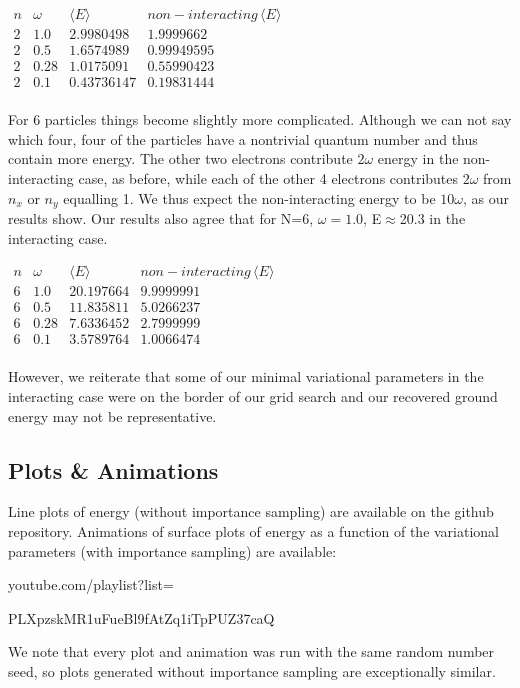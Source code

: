 \documentclass[11pt, conference, compsocconf]{IEEEtran}
\begin{document}
$\begin{array}{cccc}
n & \omega & \langle E\rangle & non-interacting\, \langle E\rangle\\
2 & 1.0 & 2.9980498 & 1.9999662\\
2 & 0.5 & 1.6574989 & 0.99949595\\
2 & 0.28 & 1.0175091 & 0.55990423\\
2 & 0.1 & 0.43736147 & 0.19831444\\
\end{array}$

For 6 particles things become slightly more complicated. Although we can not say which four, four of the particles have a nontrivial quantum number and thus contain more energy. The other two electrons contribute $2\omega$ energy in the non-interacting case, as before, while each of the other 4 electrons contributes $2\omega$ from $n_x$ or $n_y$ equalling 1. We thus expect the non-interacting energy to be $10\omega$, as our results show. Our results also agree that for N=6, $\omega=1.0$, E$\approx$20.3 in the interacting case. 

$\begin{array}{cccc}
n & \omega & \langle E\rangle & non-interacting\, \langle E\rangle\\
6 & 1.0 & 20.197664 & 9.9999991 \\
6 & 0.5 & 11.835811 & 5.0266237\\
6 & 0.28& 7.6336452 & 2.7999999\\
6 & 0.1 & 3.5789764 & 1.0066474\\
\end{array}$

However, we reiterate that some of our minimal variational parameters in the interacting case were on the border of our grid search and our recovered ground energy may not be representative.

\subsection{Plots \& Animations}
Line plots of energy (without importance sampling) are available on the github repository. Animations of surface plots of energy as a function of the variational parameters (with importance sampling) are available:
\centerline{youtube.com/playlist?list=}
\centerline{PLXpzskMR1uFueBl9fAtZq1iTpPUZ37caQ}
We note that every plot and animation was run with the same random number seed, so plots generated without importance sampling are exceptionally similar.
\end{document}
